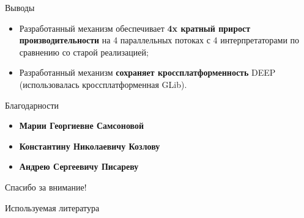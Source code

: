 \documentclass{beamer}
\begin{document}
\begin{frame}{Выводы}
\begin{itemize}
    \itemsep 2em
    \item Разработанный механизм обеспечивает
        \textbf{4x кратный прирост производительности}
        на 4 параллельных потоках с 4 интерпретаторами по
        сравнению со старой реализацией;
    \item Разработанный механизм \textbf{сохраняет кроссплатформенность} DEEP\\
        (использовалась кроссплатформенная GLib).
\end{itemize}
\end{frame}

\begin{frame}{Благодарности}
    \begin{itemize}
        \itemsep 2em
        \item \textbf{Марии Георгиевне Самсоновой}
        \item \textbf{Константину Николаевичу Козлову}
        \item \textbf{Андрею Сергеевичу Писареву}
    \end{itemize}
    \bigskip

    \vfill
    \begin{center}
        \LARGE Спасибо за внимание!
    \end{center}
\end{frame}

\begin{frame}[t,allowframebreaks]{Используемая литература}
    \nocite{Kozlov11, Kozlov13, Storn95, pisarev2015tracker,
    GLib, zaharie2002parameter, fan2003trigonometric}
    
\end{frame}
\end{document}
